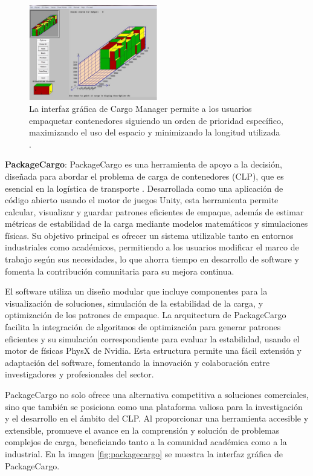 \begin{figure}[H]
    \centering
    \includegraphics[width=0.5\textwidth]{Figures/cargomanager.png}
    \caption{La interfaz gráfica de Cargo Manager permite a los usuarios empaquetar contenedores siguiendo un orden de prioridad específico, maximizando el uso del espacio y minimizando la longitud utilizada \parencite{zhao2017three}.}
    \label{fig:cargomanager}
\end{figure}

\textbf{PackageCargo}: PackageCargo es una herramienta de apoyo a la decisión, diseñada para abordar el problema de carga de contenedores (CLP), que es esencial en la logística de transporte \parencite{MARTINEZFRANCO2020100601}. Desarrollada como una aplicación de código abierto usando el motor de juegos Unity, esta herramienta permite calcular, visualizar y guardar patrones eficientes de empaque, además de estimar métricas de estabilidad de la carga mediante modelos matemáticos y simulaciones físicas. Su objetivo principal es ofrecer un sistema utilizable tanto en entornos industriales como académicos, permitiendo a los usuarios modificar el marco de trabajo según sus necesidades, lo que ahorra tiempo en desarrollo de software y fomenta la contribución comunitaria para su mejora continua.

El software utiliza un diseño modular que incluye componentes para la visualización de soluciones, simulación de la estabilidad de la carga, y optimización de los patrones de empaque. La arquitectura de PackageCargo facilita la integración de algoritmos de optimización para generar patrones eficientes y su simulación correspondiente para evaluar la estabilidad, usando el motor de físicas PhysX de Nvidia. Esta estructura permite una fácil extensión y adaptación del software, fomentando la innovación y colaboración entre investigadores y profesionales del sector.

PackageCargo no solo ofrece una alternativa competitiva a soluciones comerciales, sino que también se posiciona como una plataforma valiosa para la investigación y el desarrollo en el ámbito del CLP. Al proporcionar una herramienta accesible y extensible, promueve el avance en la comprensión y solución de problemas complejos de carga, beneficiando tanto a la comunidad académica como a la industrial. En la imagen \ref{fig:packagecargo} se muestra la interfaz gráfica de PackageCargo.

